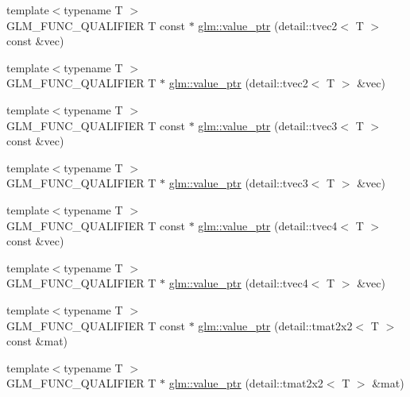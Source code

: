 \begin{DoxyCompactItemize}
\item 
{\footnotesize template$<$typename T $>$ }\\G\+L\+M\+\_\+\+F\+U\+N\+C\+\_\+\+Q\+U\+A\+L\+I\+F\+I\+E\+R T const $\ast$ \hyperlink{group__gtc__type__ptr_ga57d829c43ef1f8bbe196343744392069}{glm\+::value\+\_\+ptr} (detail\+::tvec2$<$ T $>$ const \&vec)
\item 
{\footnotesize template$<$typename T $>$ }\\G\+L\+M\+\_\+\+F\+U\+N\+C\+\_\+\+Q\+U\+A\+L\+I\+F\+I\+E\+R T $\ast$ \hyperlink{group__gtc__type__ptr_ga70900f03d3f6eead08cbeb8eebe2a596}{glm\+::value\+\_\+ptr} (detail\+::tvec2$<$ T $>$ \&vec)
\item 
{\footnotesize template$<$typename T $>$ }\\G\+L\+M\+\_\+\+F\+U\+N\+C\+\_\+\+Q\+U\+A\+L\+I\+F\+I\+E\+R T const $\ast$ \hyperlink{group__gtc__type__ptr_ga10a568d24db822588013d8087b67eaad}{glm\+::value\+\_\+ptr} (detail\+::tvec3$<$ T $>$ const \&vec)
\item 
{\footnotesize template$<$typename T $>$ }\\G\+L\+M\+\_\+\+F\+U\+N\+C\+\_\+\+Q\+U\+A\+L\+I\+F\+I\+E\+R T $\ast$ \hyperlink{group__gtc__type__ptr_ga3dfe9e6a5ebc3beeaa3a8b35cf2ffe1d}{glm\+::value\+\_\+ptr} (detail\+::tvec3$<$ T $>$ \&vec)
\item 
{\footnotesize template$<$typename T $>$ }\\G\+L\+M\+\_\+\+F\+U\+N\+C\+\_\+\+Q\+U\+A\+L\+I\+F\+I\+E\+R T const $\ast$ \hyperlink{group__gtc__type__ptr_ga75dd1f5ad6d007990c1f2cf55fe63789}{glm\+::value\+\_\+ptr} (detail\+::tvec4$<$ T $>$ const \&vec)
\item 
{\footnotesize template$<$typename T $>$ }\\G\+L\+M\+\_\+\+F\+U\+N\+C\+\_\+\+Q\+U\+A\+L\+I\+F\+I\+E\+R T $\ast$ \hyperlink{group__gtc__type__ptr_ga63ee2093cab935f4471fdc55484aeb63}{glm\+::value\+\_\+ptr} (detail\+::tvec4$<$ T $>$ \&vec)
\item 
{\footnotesize template$<$typename T $>$ }\\G\+L\+M\+\_\+\+F\+U\+N\+C\+\_\+\+Q\+U\+A\+L\+I\+F\+I\+E\+R T const $\ast$ \hyperlink{group__gtc__type__ptr_gabc0ecc372916bebbd130341cb0799376}{glm\+::value\+\_\+ptr} (detail\+::tmat2x2$<$ T $>$ const \&mat)
\item 
{\footnotesize template$<$typename T $>$ }\\G\+L\+M\+\_\+\+F\+U\+N\+C\+\_\+\+Q\+U\+A\+L\+I\+F\+I\+E\+R T $\ast$ \hyperlink{group__gtc__type__ptr_ga09141ef8c41ab15f7989b620e748ae3c}{glm\+::value\+\_\+ptr} (detail\+::tmat2x2$<$ T $>$ \&mat)

\end{DoxyCompactItemize}
